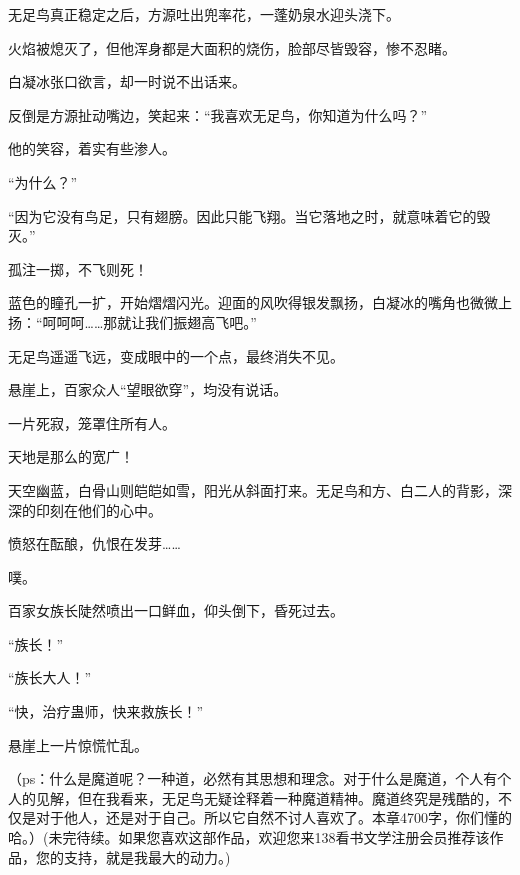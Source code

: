\begin{this_body}
无足鸟真正稳定之后，方源吐出兜率花，一蓬奶泉水迎头浇下。

火焰被熄灭了，但他浑身都是大面积的烧伤，脸部尽皆毁容，惨不忍睹。

白凝冰张口欲言，却一时说不出话来。

反倒是方源扯动嘴边，笑起来：“我喜欢无足鸟，你知道为什么吗？”

他的笑容，着实有些渗人。

“为什么？”

“因为它没有鸟足，只有翅膀。因此只能飞翔。当它落地之时，就意味着它的毁灭。”

孤注一掷，不飞则死！

蓝色的瞳孔一扩，开始熠熠闪光。迎面的风吹得银发飘扬，白凝冰的嘴角也微微上扬：“呵呵呵……那就让我们振翅高飞吧。”

无足鸟遥遥飞远，变成眼中的一个点，最终消失不见。

悬崖上，百家众人“望眼欲穿”，均没有说话。

一片死寂，笼罩住所有人。

天地是那么的宽广！

天空幽蓝，白骨山则皑皑如雪，阳光从斜面打来。无足鸟和方、白二人的背影，深深的印刻在他们的心中。

愤怒在酝酿，仇恨在发芽……

噗。

百家女族长陡然喷出一口鲜血，仰头倒下，昏死过去。

“族长！”

“族长大人！”

“快，治疗蛊师，快来救族长！”

悬崖上一片惊慌忙乱。

（ps：什么是魔道呢？一种道，必然有其思想和理念。对于什么是魔道，个人有个人的见解，但在我看来，无足鸟无疑诠释着一种魔道精神。魔道终究是残酷的，不仅是对于他人，还是对于自己。所以它自然不讨人喜欢了。本章4700字，你们懂的哈。）(未完待续。如果您喜欢这部作品，欢迎您来138看书文学注册会员推荐该作品，您的支持，就是我最大的动力。)

\end{this_body}

